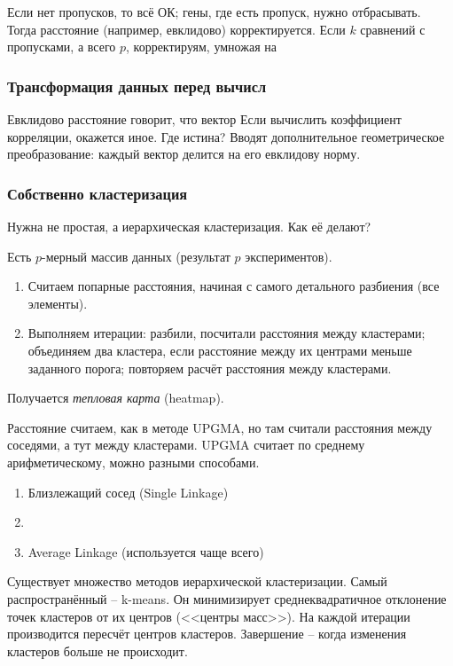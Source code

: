 \documentclass[main.tex]{subfiles}
\begin{document}
Если нет пропусков, то всё ОК; гены, где есть пропуск, нужно отбрасывать.
Тогда расстояние (например, евклидово) корректируется.
Если $ k $ сравнений с пропусками, а всего $ p $, корректируям, умножая на %

\subsubsection{Трансформация данных перед вычисл}

Евклидово расстояние говорит, что вектор %
Если вычислить коэффициент корреляции, окажется иное.
Где истина?
Вводят дополнительное геометрическое преобразование: каждый вектор делится на его евклидову норму.


\subsubsection{Собственно кластеризация}

Нужна не простая, а иерархическая кластеризация.
Как её делают?

Есть $ p $-мерный массив данных (результат $p$ экспериментов).
\begin{enumerate}[noitemsep]
	\item Считаем попарные расстояния, начиная с самого детального разбиения (все элементы).
	\item Выполняем итерации: разбили, посчитали расстояния между кластерами; объединяем два кластера, если расстояние между их центрами меньше заданного порога; повторяем расчёт расстояния между кластерами.
\end{enumerate}

Получается \emph{тепловая карта} (heatmap).

Расстояние считаем, как в методе UPGMA, но там считали расстояния между соседями, а тут между кластерами.
UPGMA считает по среднему арифметическому, можно разными способами.

\begin{enumerate}[noitemsep]
	\item Близлежащий сосед (Single Linkage)
	\item %
	\item Average Linkage (используется чаще всего)
\end{enumerate}

Существует множество методов иерархической кластеризации.
Самый распространённый -- k-means.
Он минимизирует среднеквадратичное отклонение точек кластеров от их центров (<<центры масс>>).
На каждой итерации производится пересчёт центров кластеров.
Завершение -- когда изменения кластеров больше не происходит.
\end{document}
